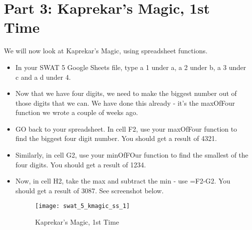\documentclass{article}
\begin{document}
\section*{Part 3: Kaprekar's Magic, 1st Time}
We will now look at Kaprekar's Magic, using spreadsheet functions.
\begin{itemize}
    \item In your SWAT 5 Google Sheets file, type a 1 under a, a 2 under b, a 3 under c and a d under 4.
    \item Now that we have four digits, we need to make the biggest number out of those digits that we can.  We have done this already - it's the maxOfFour function we wrote a couple of weeks ago.
    \item GO back to your spreadsheet.  In cell F2, use your maxOfFour function to find the biggest four digit number.  You should get a result of 4321.
    \item Similarly, in cell G2, use your minOfFOur function to find the smallest of the four digits.  You should get a result of 1234.
    \item Now, in cell  H2, take the max and subtract the min - use =F2-G2.  You should get a result of 3087.  See screenshot below.
    \begin{figure}[H]
  		\centering
  		\texttt{[image: swat\_5\_kmagic\_ss\_1]}
  		\caption{Kaprekar's Magic, 1st Time}
	\end{figure}
\end{itemize}
\end{document}
